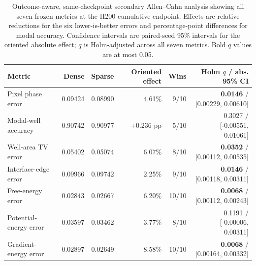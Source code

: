 \begin{table}[t]
\centering
\small
\caption{Outcome-aware, same-checkpoint secondary Allen--Cahn analysis showing all seven frozen metrics at the H200 cumulative endpoint. Effects are relative reductions for the six lower-is-better errors and percentage-point differences for modal accuracy. Confidence intervals are paired-seed 95\% intervals for the oriented absolute effect; $q$ is Holm-adjusted across all seven metrics. Bold $q$ values are at most 0.05.}
\label{tab:allen_cahn_physics_metrics}
\begin{tabular}{lrrrrr}
\toprule
Metric & Dense & Sparse & Oriented effect & Wins & Holm $q$ / abs. 95\% CI \\
\midrule
Pixel phase error & 0.09424 & 0.08990 & 4.61\% & 9/10 & \textbf{0.0146} / [0.00229, 0.00610] \\
Modal-well accuracy & 0.90742 & 0.90977 & +0.236 pp & 5/10 & 0.3027 / [-0.00551, 0.01061] \\
Well-area TV error & 0.05402 & 0.05074 & 6.07\% & 8/10 & \textbf{0.0352} / [0.00112, 0.00535] \\
Interface-edge error & 0.09966 & 0.09742 & 2.25\% & 9/10 & \textbf{0.0146} / [0.00118, 0.00311] \\
Free-energy error & 0.02843 & 0.02667 & 6.20\% & 10/10 & \textbf{0.0068} / [0.00112, 0.00243] \\
Potential-energy error & 0.03597 & 0.03462 & 3.77\% & 8/10 & 0.1191 / [-0.00006, 0.00311] \\
Gradient-energy error & 0.02897 & 0.02649 & 8.58\% & 10/10 & \textbf{0.0068} / [0.00164, 0.00332] \\
\bottomrule
\end{tabular}
\end{table}
